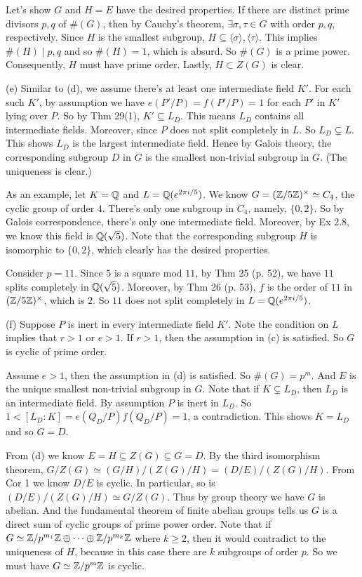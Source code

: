 \documentclass[../Marcus.tex]{subfiles}
\begin{document}
Let's show $G$ and $H=E$ have the desired properties. If there are distinct prime divisors $p,q$ of $\#(G)$, then by Cauchy's theorem, $\exists \sigma,\tau\in G$ with order $p,q$, respectively. Since $H$ is the smallest subgroup, $H\subseteq \langle\sigma\rangle,\langle\tau\rangle$. This implies $\#(H)\mid p,q$ and so $\#(H)=1$, which is absurd. So $\#(G)$ is a prime power. Consequently, $H$ must have prime order. Lastly, $H\subset Z(G)$ is clear.

(e) Similar to (d), we assume there's at least one intermediate field $K'$. For each such $K'$, by assumption we have $e(P'/P)=f(P'/P)=1$ for each $P'$ in $K'$ lying over $P$. So by Thm 29(1), $K'\subseteq L_D$. This means $L_D$ contains all intermediate fields. Moreover, since $P$ does not split completely in $L$. So $L_D\varsubsetneq L$. This shows $L_D$ is the largest intermediate field. Hence by Galois theory, the corresponding subgroup $D$ in $G$ is the smallest non-trivial subgroup in $G$. (The uniqueness is clear.)

As an example, let $K=\mathbb{Q}$ and $L=\mathbb{Q}(e^{2\pi i/5})$. We know $G=(\mathbb{Z}/5\mathbb{Z})^\times\simeq C_4$, the cyclic group of order $4$. There's only one subgroup in $C_4$, namely, $\{0,2\}$. So by Galois correspondence, there's only one intermediate field. Moreover, by Ex 2.8, we know this field is $\mathbb{Q}(\sqrt{5})$. Note that the corresponding subgroup $H$ is isomorphic to $\{0,2\}$, which clearly has the desired properties.

Consider $p=11$. Since $5$ is a square mod $11$, by Thm 25 (p. 52), we have $11$ splits completely in $\mathbb{Q}(\sqrt{5})$. Moreover, by Thm 26 (p. 53), $f$ is the order of $11$ in $(\mathbb{Z}/5\mathbb{Z})^\times$, which is $2$. So $11$ does not split completely in $L=\mathbb{Q}(e^{2\pi i/5})$.

(f) Suppose $P$ is inert in every intermediate field $K'$. Note the condition on $L$ implies that $r>1$ or $e>1$. If $r>1$, then the assumption in (c) is satisfied. So $G$ is cyclic of prime order.

Assume $e>1$, then the assumption in (d) is satisfied. So $\#(G)=p^m$. And $E$ is the unique smallest non-trivial subgroup in $G$. Note that if $K\varsubsetneq L_D$, then $L_D$ is an intermediate field. By assumption $P$ is inert in $L_D$. So $1<[L_D:K]=e(Q_D/P)f(Q_D/P)=1$, a contradiction. This shows $K=L_D$ and so $G=D$.

From (d) we know $E=H\subseteq Z(G)\subseteq G=D$. By the third isomorphism theorem, $G/Z(G) \simeq (G/H)/(Z(G)/H) = (D/E)/(Z(G)/H)$. From Cor 1 we know  $D/E$ is cyclic. In particular, so is $(D/E)/(Z(G)/H)\simeq G/Z(G)$. Thus by group theory we have $G$ is abelian. And the fundamental theorem of finite abelian groups tells us $G$ is a direct sum of cyclic groups of prime power order. Note that if $G\simeq \mathbb{Z}/p^{m_1}\mathbb{Z}\oplus\cdots\oplus\mathbb{Z}/p^{m_k}\mathbb{Z}$ where $k\geq 2$, then it would contradict to the uniqueness of $H$, because in this case there are $k$ subgroups of order $p$. So we must have $G\simeq \mathbb{Z}/p^m\mathbb{Z}$ is cyclic.
\end{document}
